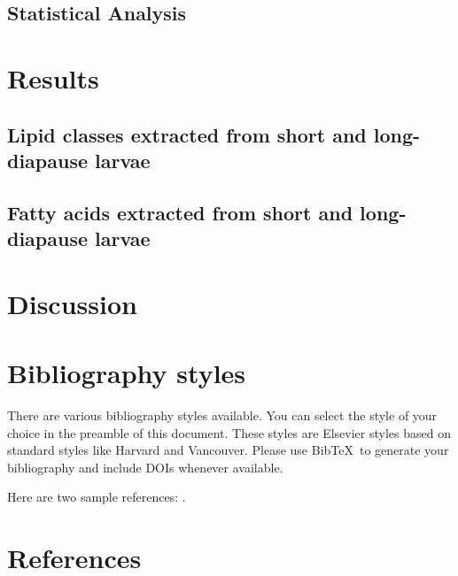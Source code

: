\documentclass[review]{elsarticle}
\begin{document}
\subsection{Statistical Analysis}

\section{Results}
\subsection{Lipid classes extracted from short and long-diapause larvae}

\subsection{Fatty acids extracted from short and long-diapause larvae}

\section{Discussion}

\section{Bibliography styles}

There are various bibliography styles available. You can select the style of your choice in the preamble of this document. These styles are Elsevier styles based on standard styles like Harvard and Vancouver. Please use Bib\TeX\ to generate your bibliography and include DOIs whenever available.

Here are two sample references: \cite{Feynman1963118,Dirac1953888}.

\section*{References}


\end{document}
